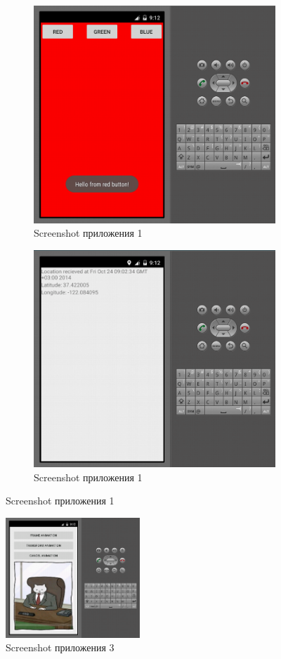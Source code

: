 \documentclass[pscyr,nonums]{hedlab}
\begin{document}
    \begin{figure}[!ht]
        \centering
        \begin{subfigure}[b]{0.45\textwidth}
            \includegraphics[width=\textwidth]{01}
            \caption{Screenshot приложения 1}
        \end{subfigure}
        \begin{subfigure}[b]{0.45\textwidth}
            \includegraphics[width=\textwidth]{02}
            \caption{Screenshot приложения 1}
        \end{subfigure}
    \end{figure}
    \begin{figure}
        \center
        \includegraphics[width=0.45\textwidth]{03}
        \caption{Screenshot приложения 3}
    \end{figure}
\end{document}
